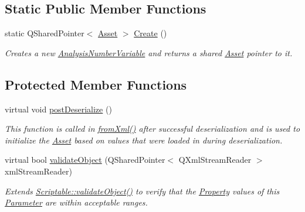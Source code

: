 \subsection*{Static Public Member Functions}
\begin{DoxyCompactItemize}
\item 
\hypertarget{class_picto_1_1_analysis_number_variable_ac52950a858aa754444111222c49f8f0e}{static Q\-Shared\-Pointer$<$ \hyperlink{class_picto_1_1_asset}{Asset} $>$ \hyperlink{class_picto_1_1_analysis_number_variable_ac52950a858aa754444111222c49f8f0e}{Create} ()}\label{class_picto_1_1_analysis_number_variable_ac52950a858aa754444111222c49f8f0e}

\begin{DoxyCompactList}\small\item\em Creates a new \hyperlink{class_picto_1_1_analysis_number_variable}{Analysis\-Number\-Variable} and returns a shared \hyperlink{class_picto_1_1_asset}{Asset} pointer to it. \end{DoxyCompactList}\end{DoxyCompactItemize}
\subsection*{Protected Member Functions}
\begin{DoxyCompactItemize}
\item 
virtual void \hyperlink{class_picto_1_1_analysis_number_variable_a66376560630c67d8616d27baec9df56f}{post\-Deserialize} ()
\begin{DoxyCompactList}\small\item\em This function is called in \hyperlink{class_picto_1_1_asset_a8bed4da09ecb1c07ce0dab313a9aba67}{from\-Xml()} after successful deserialization and is used to initialize the \hyperlink{class_picto_1_1_asset}{Asset} based on values that were loaded in during deserialization. \end{DoxyCompactList}\item 
virtual bool \hyperlink{class_picto_1_1_analysis_number_variable_a8bd41a1ccf35063cc5cef779ee3197cc}{validate\-Object} (Q\-Shared\-Pointer$<$ Q\-Xml\-Stream\-Reader $>$ xml\-Stream\-Reader)
\begin{DoxyCompactList}\small\item\em Extends \hyperlink{class_picto_1_1_scriptable_ab6e2944c43a3b5d418bf7b251594386d}{Scriptable\-::validate\-Object()} to verify that the \hyperlink{class_picto_1_1_property}{Property} values of this \hyperlink{class_picto_1_1_parameter}{Parameter} are within acceptable ranges. \end{DoxyCompactList}\end{DoxyCompactItemize}
